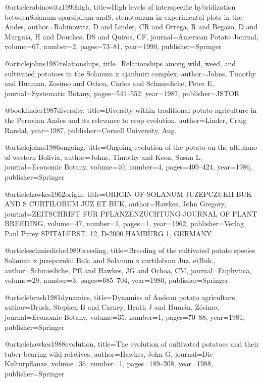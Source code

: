{@article{rabinowitz1990high,
  title={High levels of interspecific hybridization betweenSolanum sparsipilum andS. stenotomum in experimental plots in the Andes},
  author={Rabinowitz, D and Linder, CR and Ortega, R and Begazo, D and Murguia, H and Douches, DS and Quiros, CF},
  journal={American Potato Journal},
  volume={67},
  number={2},
  pages={73--81},
  year={1990},
  publisher={Springer}
}

@article{johns1987relationships,
  title={Relationships among wild, weed, and cultivated potatoes in the Solanum x ajanhuiri complex},
  author={Johns, Timothy and Huaman, Zosimo and Ochoa, Carlos and Schmiediche, Peter E},
  journal={Systematic Botany},
  pages={541--552},
  year={1987},
  publisher={JSTOR}
}

@book{linder1987diversity,
  title={Diversity within traditional potato agriculture in the Peruvian Andes and its relevance to crop evolution},
  author={Linder, Craig Randal},
  year={1987},
  publisher={Cornell University, Aug.}
}

@article{johns1986ongoing,
  title={Ongoing evolution of the potato on the altiplano of western Bolivia},
  author={Johns, Timothy and Keen, Susan L},
  journal={Economic Botany},
  volume={40},
  number={4},
  pages={409--424},
  year={1986},
  publisher={Springer}
}

@article{hawkes1962origin,
  title={ORIGIN OF SOLANUM JUZEPCZUKII BUK AND S CURTILOBUM JUZ ET BUK},
  author={Hawkes, John Gregory},
  journal={ZEITSCHRIFT FUR PFLANZENZUCHTUNG-JOURNAL OF PLANT BREEDING},
  volume={47},
  number={1},
  pages={1},
  year={1962},
  publisher={Verlag Paul Parey SPITALERST. 12, D-2000 HAMBURG 1, GERMANY}
}

@article{schmiediche1980breeding,
  title={Breeding of the cultivated potato species Solanum x juzepczukii Buk. and Solanum x curtilobum Juz. etBuk.},
  author={Schmiediche, PE and Hawkes, JG and Ochoa, CM},
  journal={Euphytica},
  volume={29},
  number={3},
  pages={685--704},
  year={1980},
  publisher={Springer}
}

@article{brush1981dynamics,
  title={Dynamics of Andean potato agriculture},
  author={Brush, Stephen B and Carney, Heath J and Hum{\'a}n, Z{\'o}simo},
  journal={Economic Botany},
  volume={35},
  number={1},
  pages={70--88},
  year={1981},
  publisher={Springer}
}

@article{hawkes1988evolution,
  title={The evolution of cultivated potatoes and their tuber-bearing wild relatives},
  author={Hawkes, John G},
  journal={Die Kulturpflanze},
  volume={36},
  number={1},
  pages={189--208},
  year={1988},
  publisher={Springer}
}

}
